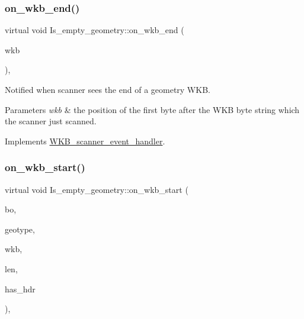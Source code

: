 \subsubsection{\texorpdfstring{on\+\_\+wkb\+\_\+end()}{on\_wkb\_end()}}
{\footnotesize\ttfamily virtual void Is\+\_\+empty\+\_\+geometry\+::on\+\_\+wkb\+\_\+end (\begin{DoxyParamCaption}\item[{const void $\ast$}]{wkb }\end{DoxyParamCaption})\hspace{0.3cm}{\ttfamily [inline]}, {\ttfamily [virtual]}}

Notified when scanner sees the end of a geometry W\+KB. 
\begin{DoxyParams}{Parameters}
{\em wkb} & the position of the first byte after the W\+KB byte string which the scanner just scanned. \\
\hline
\end{DoxyParams}


Implements \mbox{\hyperlink{classWKB__scanner__event__handler_a07c27cceefdd31f25f1d0b3754786b78}{W\+K\+B\+\_\+scanner\+\_\+event\+\_\+handler}}.

\mbox{\label{classIs__empty__geometry_a30bc84d35b5a414d1366b57a6ba02f2e}} 
\subsubsection{\texorpdfstring{on\+\_\+wkb\+\_\+start()}{on\_wkb\_start()}}
{\footnotesize\ttfamily virtual void Is\+\_\+empty\+\_\+geometry\+::on\+\_\+wkb\+\_\+start (\begin{DoxyParamCaption}\item[{Geometry\+::wkb\+Byte\+Order}]{bo,  }\item[{Geometry\+::wkb\+Type}]{geotype,  }\item[{const void $\ast$}]{wkb,  }\item[{uint32}]{len,  }\item[{bool}]{has\+\_\+hdr }\end{DoxyParamCaption})\hspace{0.3cm}{\ttfamily [inline]}, {\ttfamily [virtual]}}

